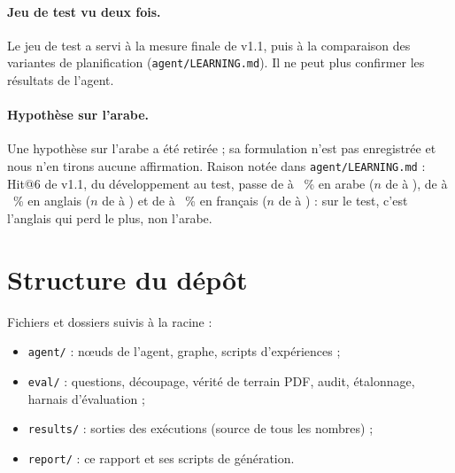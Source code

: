 \paragraph{Jeu de test vu deux fois.} Le jeu de test a servi à la mesure finale de v1.1, puis à la comparaison des
variantes de planification (\texttt{agent/LEARNING.md}). Il ne peut plus confirmer les résultats de l'agent.

\paragraph{Hypothèse sur l'arabe.} Une hypothèse sur l'arabe a été retirée ; sa formulation n'est pas enregistrée et nous n'en
tirons aucune affirmation. Raison notée dans \texttt{agent/LEARNING.md} : Hit@6 de v1.1, du développement au test, passe de
\EvWithdrawnArDev{} à \EvWithdrawnArTest~\% en arabe ($n$ de \EvWithdrawnArDevN{} à \EvWithdrawnArTestN), de \EvWithdrawnEnDev{} à
\EvWithdrawnEnTest~\% en anglais ($n$ de \EvWithdrawnEnDevN{} à \EvWithdrawnEnTestN) et de \EvWithdrawnFrDev{} à \EvWithdrawnFrTest~\% en
français ($n$ de \EvWithdrawnFrDevN{} à \EvWithdrawnFrTestN) : sur le test, c'est l'anglais qui perd le plus, non l'arabe.

\section{Structure du dépôt}
Fichiers et dossiers suivis à la racine :

\begin{itemize}
  \item \texttt{agent/} : nœuds de l'agent, graphe, scripts d'expériences ;
  \item \texttt{eval/} : questions, découpage, vérité de terrain PDF, audit, étalonnage, harnais d'évaluation ;
  \item \texttt{results/} : sorties des exécutions (source de tous les nombres) ;
  \item \texttt{report/} : ce rapport et ses scripts de génération.
\end{itemize}
